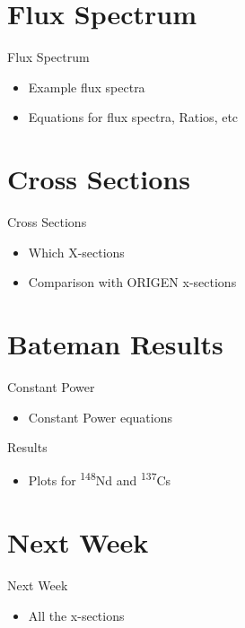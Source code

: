 \documentclass{beamer}
\newcommand{\tss}{\textsuperscript}
\begin{document}
\section{Flux Spectrum}
\begin{frame}{Flux Spectrum}
  \begin{itemize}
  \item{Example flux spectra}
  \item{Equations for flux spectra, Ratios, etc}
  \end{itemize}
\end{frame}

\section{Cross Sections}
\begin{frame}{Cross Sections}
  \begin{itemize}
  \item{Which X-sections}
  \item{Comparison with ORIGEN x-sections}
  \end{itemize}
\end{frame}

\section{Bateman Results}
\begin{frame}{Constant Power}
  \begin{itemize}
  \item{Constant Power equations}
  \end{itemize}
\end{frame}

\begin{frame}{Results}
  \begin{itemize}
  \item{Plots for \tss{148}Nd and \tss{137}Cs}
  \end{itemize}
\end{frame}


\section{Next Week}
\begin{frame}{Next Week}
  \begin{itemize}
  \item{All the x-sections}
  \end{itemize}
\end{frame}
\end{document}
